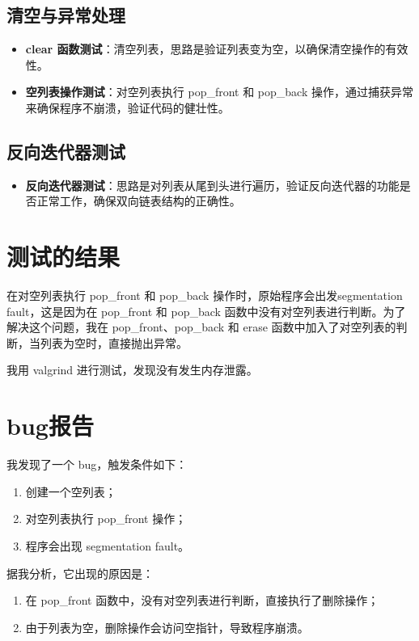 \documentclass[UTF8]{ctexart}
\begin{document}
\subsection{清空与异常处理}
\begin{itemize}
\item \textbf{clear 函数测试}：清空列表，思路是验证列表变为空，以确保清空操作的有效性。
\item \textbf{空列表操作测试}：对空列表执行 pop\_front 和 pop\_back 操作，通过捕获异常来确保程序不崩溃，验证代码的健壮性。
\end{itemize}


\subsection{反向迭代器测试}
\begin{itemize}
\item \textbf{反向迭代器测试}：思路是对列表从尾到头进行遍历，验证反向迭代器的功能是否正常工作，确保双向链表结构的正确性。
\end{itemize}


\section{测试的结果}

在对空列表执行 pop\_front 和 pop\_back 操作时，原始程序会出发segmentation fault，这是因为在 pop\_front 和 pop\_back 函数中没有对空列表进行判断。为了解决这个问题，我在 pop\_front、pop\_back 和 erase 函数中加入了对空列表的判断，当列表为空时，直接抛出异常。


我用 valgrind 进行测试，发现没有发生内存泄露。

\section{bug报告}

我发现了一个 bug，触发条件如下：

\begin{enumerate}
    \item 创建一个空列表；
    \item 对空列表执行 pop\_front 操作；
    \item 程序会出现 segmentation fault。
\end{enumerate}

据我分析，它出现的原因是：

\begin{enumerate}
    \item 在 pop\_front 函数中，没有对空列表进行判断，直接执行了删除操作；
    \item 由于列表为空，删除操作会访问空指针，导致程序崩溃。
\end{enumerate}
\end{document}
